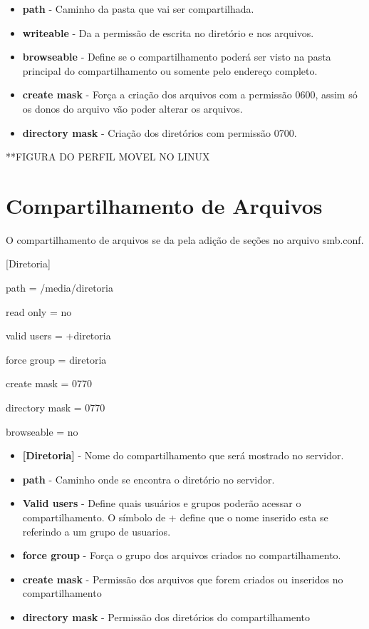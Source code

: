 \begin{itemize}
	\item \textbf {path} - Caminho da pasta que vai ser compartilhada.
	\item \textbf {writeable} - Da a permissão de escrita no diretório e nos arquivos.
	\item \textbf {browseable} - Define se o compartilhamento poderá ser visto na pasta principal do compartilhamento ou somente pelo endereço completo.
	\item \textbf {create mask} - Força a criação dos arquivos com a permissão 0600, assim só os donos do arquivo vão poder alterar os arquivos.
	\item \textbf {directory mask} - Criação dos diretórios com permissão 0700.
\end{itemize}

**FIGURA DO PERFIL MOVEL NO LINUX

\section{Compartilhamento de Arquivos}

O compartilhamento de arquivos se da pela adição de seções no arquivo smb.conf.

[Diretoria]

path = /media/diretoria

read only = no

valid users = +diretoria

force group = diretoria

create mask = 0770

directory mask = 0770

browseable = no

\begin{itemize}
	\item \textbf{[Diretoria]} - Nome do compartilhamento que será mostrado no servidor.
	\item \textbf{path} - Caminho onde se encontra o diretório no servidor.
	\item \textbf{Valid users} - Define quais usuários e grupos poderão acessar o compartilhamento. O símbolo de + define que o nome inserido esta se referindo a um grupo de usuarios.
	\item \textbf{force group} - Força o grupo dos arquivos criados no compartilhamento.
	\item \textbf{create mask} - Permissão dos arquivos que forem criados ou inseridos no compartilhamento
	\item \textbf{directory mask} - Permissão dos diretórios do compartilhamento
\end{itemize}


